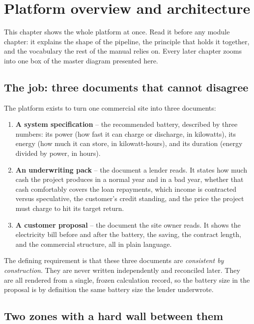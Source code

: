 \chapter{Platform overview and architecture}
\label{ch:overview}

This chapter shows the whole platform at once. Read it before any module chapter: it explains the shape of the pipeline, the principle that holds it together, and the vocabulary the rest of the manual relies on. Every later chapter zooms into one box of the master diagram presented here.

\section{The job: three documents that cannot disagree}

The platform exists to turn one commercial site into three documents:

\begin{enumerate}
  \item \textbf{A system specification} -- the recommended battery, described by three numbers: its power (how fast it can charge or discharge, in kilowatts), its energy (how much it can store, in kilowatt-hours), and its duration (energy divided by power, in hours).
  \item \textbf{An underwriting pack} -- the document a lender reads. It states how much cash the project produces in a normal year and in a bad year, whether that cash comfortably covers the loan repayments, which income is contracted versus speculative, the customer's credit standing, and the price the project must charge to hit its target return.
  \item \textbf{A customer proposal} -- the document the site owner reads. It shows the electricity bill before and after the battery, the saving, the contract length, and the commercial structure, all in plain language.
\end{enumerate}

The defining requirement is that these three documents are \emph{consistent by construction}. They are never written independently and reconciled later. They are all rendered from a single, frozen calculation record, so the battery size in the proposal is by definition the same battery size the lender underwrote.

\section{Two zones with a hard wall between them}

